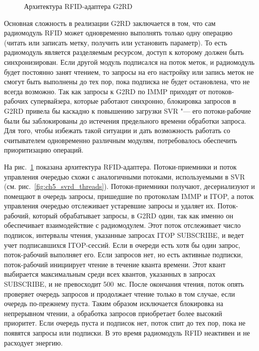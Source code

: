 \begin{figure}[ht]
  \caption{Архитектура RFID-адаптера G2RD}
  \label{fig:ch5_g2rd_threads}
\end{figure}


Основная сложность в реализации G2RD заключается в том, что сам радиомодуль RFID может одновременно выполнять только одну операцию (читать или записать метку, получить или установить параметр). То есть радиомодуль является разделяемым ресурсом, доступ к которому должен быть синхронизирован. Если другой модуль подписался на поток меток, и радиомодуль будет постоянно занят чтением, то запросы на его настройку или запись меток не смогут быть выполнены до тех пор, пока подписка не будет остановлена, что не всегда возможно. Так как запросы к G2RD по IMMP приходят от потоков-рабочих супервайзера, которые работают синхронно, блокировка запросов в G2RD привела бы каскадно к повышению загрузки SVR "--- его потоки-рабочие были бы заблокированы до истечения предельного времени обработки запроса. Для того, чтобы избежать такой ситуации и дать возможность работать со считывателем одновременно различным модулям, потребовалось обеспечить приоритизацию операций.

На рис.~\ref{fig:ch5_g2rd_threads} показана архитектура RFID-адаптера. Потоки-приемники и поток управления очередью схожи с аналогичными потоками, используемыми в SVR (см. рис.~\ref{fig:ch5_svrd_threads}). Потоки-приемники получают, десериализуют и помещают в очередь запросы, пришедшие по протоколам IMMP и ITOP, а поток управления очередью отслеживает устаревшие запросы и удаляет их. Поток-рабочий, который обрабатывает запросы, в G2RD один, так как именно он обеспечивает взаимодействие с радиомодулем. Этот поток отслеживает число подписок, интервалы чтения, указанные запросах ITOP SUBSCRIBE, и ведет учет подписавшихся ITOP-сессий. Если в очереди есть хотя бы один запрос, поток-рабочий выполняет его. Если запросов нет, но есть активные подписки, поток-рабочий инициирует чтение в течение кванта времени. Этот квант выбирается максимальным среди всех квантов, указанных в запросах SUBSCRIBE, и не превосходит 500~мс. После окончания чтения, поток опять проверяет очередь запросов и продолжает чтение только в том случае, если очередь по-прежнему пуста. Таким образом исключается блокировка на непрерывном чтении, а обработка запросов приобретает более высокий приоритет. Если очередь пуста и подписок нет, поток спит до тех пор, пока не появятся запросы или подписки. В это время радиомодуль RFID неактивен и не расходует энергию.


